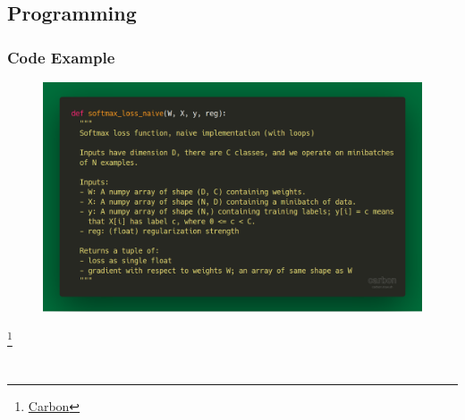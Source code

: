 \documentclass{SKP-beamer}
\begin{document}
\subsection{Programming}
\begin{frame}[fragile]

\frametitle{Code Example}

\begin{figure}
\centering
\includegraphics[width=\linewidth]{images/carbon.png}
\end{figure}
\footnote{\href{https://github.com/dawnlabs/carbon}{Carbon}}



\end{frame}
\section*{}
\begin{frame}
	\begin{center}
		\begin{pgfpicture}{0cm}{0cm}{3cm}{3cm}
			\pgfsetlinewidth{2pt}
			\pgfstroke
			
			\pgfstroke
			
		\end{pgfpicture}
	\end{center}
\end{frame}
\end{document}
